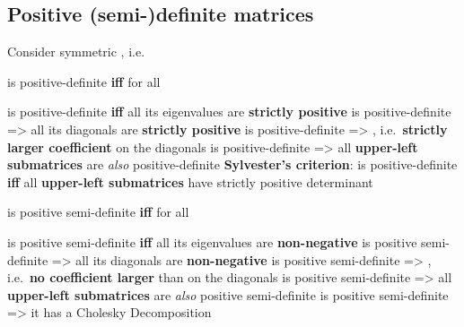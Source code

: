 
\subsection*{Positive (semi-)definite matrices}

Consider symmetric ,
i.e. 

 is positive-definite \textbf{iff}  for all

\begin{itemize}

      \vItem
             is positive-definite \textbf{iff} all its eigenvalues are
            \textbf{strictly positive}
      \vItem
             is positive-definite =\textgreater{} all its diagonals are
            \textbf{strictly positive}
      \vItem
             is positive-definite =\textgreater{}
            , i.e.~\textbf{strictly
                  larger coefficient} on the diagonals
      \vItem
             is positive-definite =\textgreater{} all
            \textbf{upper-left submatrices} are \emph{also} positive-definite
      \vItem
            \textbf{Sylvester's criterion}:  is positive-definite
            \textbf{iff} all \textbf{upper-left submatrices} have strictly
            positive determinant
\end{itemize}

\hSep %

 is positive semi-definite \textbf{iff} 
for all 

\begin{itemize}

      \vItem
             is positive semi-definite \textbf{iff} all its eigenvalues
            are \textbf{non-negative}
      \vItem
             is positive semi-definite =\textgreater{} all its
            diagonals are \textbf{non-negative}
      \vItem
             is positive semi-definite =\textgreater{}
            , i.e.~\textbf{no
                  coefficient larger} than on the diagonals
      \vItem
             is positive semi-definite =\textgreater{} all
            \textbf{upper-left submatrices} are \emph{also} positive
            semi-definite
      \vItem
             is positive semi-definite =\textgreater{} it has a
            Cholesky Decomposition
\end{itemize}

